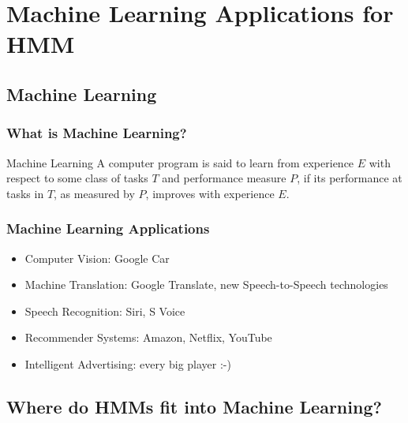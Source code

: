 \section{Machine Learning Applications for HMM}
\label{sec:ml}

\subsection{Machine Learning}
\label{sec:hmm_in_ml}

\begin{frame}
  \frametitle{What is Machine Learning?}
  \begin{block}{Machine Learning}
    A computer program is said to learn from experience $E$ with
    respect to some class of tasks $T$ and performance measure $P$, if
    its performance at tasks in $T$, as measured by $P$, improves with
    experience $E$.
  \end{block}
\end{frame}

\begin{frame}
  \frametitle{Machine Learning Applications}
  \begin{itemize}
  \item Computer Vision: Google Car
  \item Machine Translation: Google Translate, new Speech-to-Speech technologies
  \item Speech Recognition: Siri, S Voice
  \item Recommender Systems: Amazon, Netflix, YouTube
  \item Intelligent Advertising: every big player :-)
  \end{itemize}
\end{frame}

\subsection{Where do HMMs fit into Machine Learning?}
\label{sec:apps}

